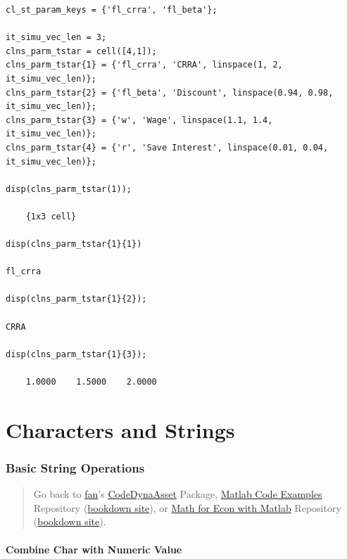 \documentclass[
]{book}
\begin{document}
\begin{verbatim}
cl_st_param_keys = {'fl_crra', 'fl_beta'};

it_simu_vec_len = 3;
clns_parm_tstar = cell([4,1]);
clns_parm_tstar{1} = {'fl_crra', 'CRRA', linspace(1, 2, it_simu_vec_len)};
clns_parm_tstar{2} = {'fl_beta', 'Discount', linspace(0.94, 0.98, it_simu_vec_len)};
clns_parm_tstar{3} = {'w', 'Wage', linspace(1.1, 1.4, it_simu_vec_len)};
clns_parm_tstar{4} = {'r', 'Save Interest', linspace(0.01, 0.04, it_simu_vec_len)};

disp(clns_parm_tstar(1));

    {1x3 cell}

disp(clns_parm_tstar{1}{1})

fl_crra

disp(clns_parm_tstar{1}{2});

CRRA

disp(clns_parm_tstar{1}{3});

    1.0000    1.5000    2.0000
\end{verbatim}

\hypertarget{characters-and-strings}{%
\section{Characters and Strings}\label{characters-and-strings}}

\hypertarget{basic-string-operations}{%
\subsubsection{Basic String Operations}\label{basic-string-operations}}

\begin{quote}
Go back to \href{http://fanwangecon.github.io/}{fan}'s \href{https://fanwangecon.github.io/CodeDynaAsset/}{CodeDynaAsset} Package, \href{https://fanwangecon.github.io/M4Econ/}{Matlab Code Examples} Repository (\href{https://fanwangecon.github.io/M4Econ/bookdown}{bookdown site}), or \href{https://fanwangecon.github.io/Math4Econ/}{Math for Econ with Matlab} Repository (\href{https://fanwangecon.github.io/Math4Econ/bookdown}{bookdown site}).
\end{quote}

\hypertarget{combine-char-with-numeric-value}{%
\paragraph{Combine Char with Numeric Value}\label{combine-char-with-numeric-value}}
\end{document}
